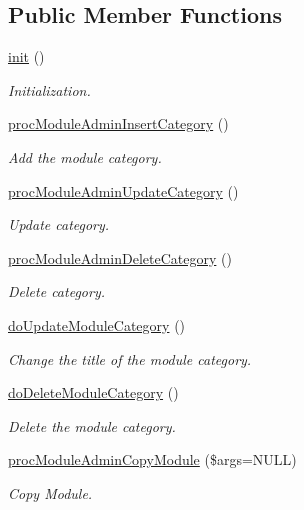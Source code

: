 \subsection*{Public Member Functions}
\begin{DoxyCompactItemize}
\item 
\hyperlink{classmoduleAdminController_a837ce6924f939b13b35325690da032d2}{init} ()
\begin{DoxyCompactList}\small\item\em Initialization. \end{DoxyCompactList}\item 
\hyperlink{classmoduleAdminController_a63e53d2b8c360b3b2c03fd18d8f25d41}{proc\+Module\+Admin\+Insert\+Category} ()
\begin{DoxyCompactList}\small\item\em Add the module category. \end{DoxyCompactList}\item 
\hyperlink{classmoduleAdminController_a75e4a9dfbc37befe7ab2758c62322821}{proc\+Module\+Admin\+Update\+Category} ()
\begin{DoxyCompactList}\small\item\em Update category. \end{DoxyCompactList}\item 
\hyperlink{classmoduleAdminController_a49c74e7b6a1ad06aeea82a0f1993b147}{proc\+Module\+Admin\+Delete\+Category} ()
\begin{DoxyCompactList}\small\item\em Delete category. \end{DoxyCompactList}\item 
\hyperlink{classmoduleAdminController_a90d82f2c0b0716c10e246f9866c9f37f}{do\+Update\+Module\+Category} ()
\begin{DoxyCompactList}\small\item\em Change the title of the module category. \end{DoxyCompactList}\item 
\hyperlink{classmoduleAdminController_a80e37ec16dc036325888cb3890b51575}{do\+Delete\+Module\+Category} ()
\begin{DoxyCompactList}\small\item\em Delete the module category. \end{DoxyCompactList}\item 
\hyperlink{classmoduleAdminController_a0540f21334c59ffebd82e08aa24114ab}{proc\+Module\+Admin\+Copy\+Module} (\$args=N\+U\+LL)
\begin{DoxyCompactList}\small\item\em Copy Module. \end{DoxyCompactList}\item 

\end{DoxyCompactItemize}
